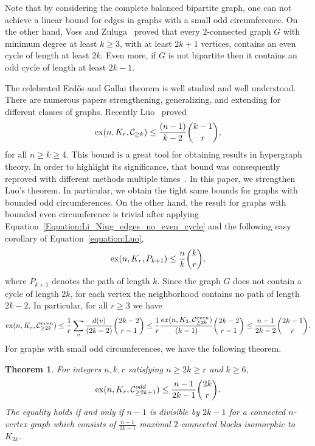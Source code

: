 \documentclass[a4paper,11pt]{article}
\newtheorem{theorem}{Theorem}
\def\C{\mathcal C}
\newcommand{\ex}{{\rm  ex}}
\begin{document}
Note that by considering the complete balanced bipartite graph, one can not achieve a linear bound for edges in graphs with a small odd circumference. On the other hand, Voss and Zuluga~\cite{voss1977maximale} proved that every $2$-connected graph $G$ with minimum degree at least   $k\geq3$, with at least $2k+1$ vertices, contains an even cycle of length at least $2k$. Even more, if $G$ is not bipartite then it contains an odd cycle of length at least $2k-1$. 



The celebrated Erd\H{o}s and Gallai theorem is well studied and well understood. There are numerous papers strengthening, generalizing, and extending for different classes of graphs. Recently Luo~\cite{luo2018maximum} proved 
\begin{equation}\label{equation:Luo}
\ex(n,K_r,\C_{\geq k})\leq \frac{(n-1)}{k-2}\binom{k-1}{r},    
\end{equation}
for all $n\geq k \geq 4$. This bound is a great tool for obtaining results in hypergraph theory. In order to highlight its significance, that bound was consequently reproved with different methods multiple times~\cite{ning2020extensions, zhu2022stability}. 
In this paper, we strengthen Luo's theorem. In particular, we obtain the tight same bounds for graphs with bounded odd circumferences. 
On the other hand, the result for graphs with bounded even circumference is trivial after applying Equation~\ref{Equation:Li_Ning_edges_no_even_cycle} and the following easy corollary of Equation~\ref{equation:Luo},
\[
\ex(n,K_r,P_{k+1}) \leq \frac{n}{k}\binom{k}{r},    
\]
where $P_{k+1}$ denotes the path of length $k$.
Since the graph $G$ does not contain a cycle of length $2k$, for each vertex the neighborhood contains no path of length $2k-2$.  
In particular, for all $r\geq 3$ we have
\[
\ex(n,K_r,\C^{even}_{\geq 2k})\leq \frac{1}{r}\sum_{v}\frac{d(v)}{(2k-2)}\binom{2k-2}{r-1}\leq \frac{1}{r}\frac{ex(n,K_{2},\C^{even}_{\geq 2k})}{(k-1)}\binom{2k-2}{r-1}
\leq \frac{n-1}{2k-2}\binom{2k-1}{r}.
\]
 For graphs with small odd circumferences, we have the following theorem.

\begin{theorem}\label{thm:K_r_odd-free}
For integers $n,k,r$ satisfying $n\geq 2k \geq r$ and $k\geq 6$, 
\[
\ex(n,K_r,\C^{odd}_{\geq 2k+1})\leq \frac{n-1}{2k-1}\binom{2k}{r}.
\]
The equality holds if and only if $n-1$ is divisible by $2k-1$ for a connected $n$-vertex graph which consists of $\frac{n-1}{2k-1}$ maximal $2$-connected blocks isomorphic to $K_{2k}$. 
\end{theorem}
\end{document}
